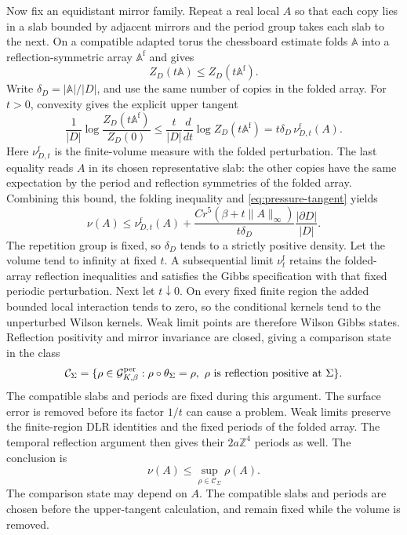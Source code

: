 \documentclass[11pt,letterpaper,reqno]{amsart}
\theoremstyle{definition}
\theoremstyle{remark}
\begin{document}
Now fix an equidistant mirror family. Repeat a real local $A$ so that
each copy lies in a slab bounded by adjacent mirrors and the period
group takes each slab to the next. On a compatible adapted torus the
chessboard estimate folds $\mathbb A$ into a reflection-symmetric
array $\mathbb A^{\mathrm f}$ and gives
\[
 Z_D(t\mathbb A)\le Z_D(t\mathbb A^{\mathrm f}).
\]
Write $\delta_D=|\mathbb A|/|D|$, and use the same number of
copies in the folded array. For $t>0$, convexity gives the explicit
upper tangent
\[
 \frac1{|D|}\log\frac{Z_D(t\mathbb A^{\mathrm f})}{Z_D(0)}
 \le \frac{t}{|D|}\frac{d}{dt}\log Z_D(t\mathbb A^{\mathrm f})
 =t\delta_D\,\nu_{D,t}^{\mathrm f}(A).
\]
Here $\nu_{D,t}^{\mathrm f}$ is the finite-volume measure with the
folded perturbation. The last equality reads $A$ in its chosen
representative slab: the other copies have the same expectation by
the period and reflection symmetries of the folded array. Combining
this bound, the folding inequality and \eqref{eq:pressure-tangent}
yields
\[
 \nu(A)\le\nu_{D,t}^{\mathrm f}(A)
 +\frac{Cr^5(\beta+t\|A\|_\infty)}{t\delta_D}
                          \frac{|\partial D|}{|D|}.
\]
The repetition group is fixed, so $\delta_D$ tends to a strictly
positive density. Let the volume tend to infinity at fixed $t$.
A subsequential limit $\nu_t^{\mathrm f}$ retains the folded-array
reflection inequalities and satisfies the Gibbs specification with
that fixed periodic perturbation. Next let $t\downarrow0$. On every
fixed finite region the added bounded local interaction tends to
zero, so the conditional kernels tend to the unperturbed Wilson
kernels. Weak limit points are therefore Wilson Gibbs states.
Reflection positivity and mirror invariance are closed, giving a
comparison state in the class
\[
 \mathcal C_\Sigma=
 \{\rho\in\mathcal G^{\mathrm{per}}_{K,\beta}:
       \rho\circ\theta_\Sigma=\rho,
       \ \rho\hbox{ is reflection positive at }\Sigma\}.
\]
The compatible slabs and periods are fixed during this argument.
The surface error is removed before its factor $1/t$ can cause a
problem. Weak limits preserve the finite-region DLR identities and
the fixed periods of the folded array. The temporal reflection
argument then gives their $2a\mathbb Z^4$ periods as well. The
conclusion is
\begin{equation}\label{eq:expanded-mirror-comparison}
 \nu(A)\le\sup_{\rho\in\mathcal C_\Sigma}\rho(A).
\end{equation}
The comparison state may depend on $A$. The compatible slabs and
periods are chosen before the upper-tangent calculation, and remain
fixed while the volume is removed.
\end{document}
